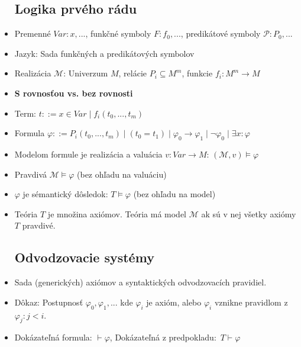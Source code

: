 \documentclass[paper=a4, fontsize=11pt]{scrartcl} %
\numberwithin{equation}{section} %
\numberwithin{figure}{section} %
\numberwithin{table}{section} %
\begin{document}
\begin{itemize}
	\subsection{Logika prvého rádu}
	
	\item Premenné $Var : x, ...$, funkčné symboly $F : f_0, ...$, predikátové symboly $\mathcal{P} : P_0, ...$
	
	\item Jazyk: Sada funkčných a predikátových symbolov 
	
	\item Realizácia $\mathcal{M}$: Univerzum $M$, relácie $P_i \subseteq M^{m}$, funkcie $f_i : M^{m} \to M$
	
	\item \textbf{S rovnosťou vs. bez rovnosti}
	
	\item Term: $t ::= x \in Var \mid f_i(t_0, ..., t_m)$
	
	\item Formula $\varphi ::= P_i(t_0, ..., t_m) \mid (t_0 = t_1) \mid \varphi_0 \to \varphi_1 \mid \neg \varphi_0 \mid \exists x : \varphi$
	
	\item Modelom formule je realizácia a valuácia $v : Var \to M$: $(\mathcal{M}, v) \models \varphi$
	
	\item Pravdivá $\mathcal{M} \models \varphi$ (bez ohľadu na valuáciu)
	
	\item $\varphi$ je sémantický dôsledok: $T \models \varphi$ (bez ohľadu na model)
	
	\item Teória $T$ je množina axiómov. Teória má model $\mathcal{M}$ ak sú v nej všetky axiómy $T$ pravdivé.

	\subsection{Odvodzovacie systémy}
	
	\item Sada (generických) axiómov a syntaktických odvodzovacích pravidiel.
	
	\item Dôkaz: Postupnosť $\varphi_0, \varphi_1, ...$ kde $\varphi_i$ je axióm, alebo $\varphi_i$ vznikne pravidlom z $\varphi_j : j < i$.
	
	\item Dokázateľná formula: $\vdash \varphi$, Dokázateľná z predpokladu: $T \vdash \varphi$
	

\end{itemize}
\end{document}
